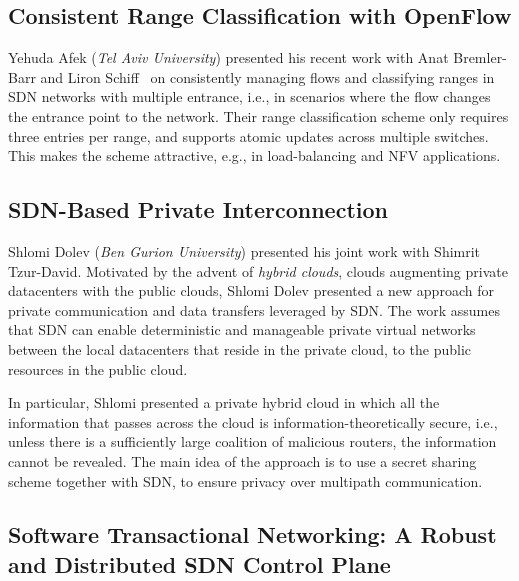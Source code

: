 \documentclass[11pt,pdftex,letter]{article}
\begin{document}
\subsection{Consistent Range Classification with OpenFlow}

Yehuda Afek ({\em Tel Aviv University}) presented his recent work with Anat Bremler-Barr and
Liron Schiff~\cite{AfekBS14} on consistently managing flows and classifying ranges
in SDN networks with multiple entrance, i.e., in scenarios where the flow changes the entrance point
to the network.
Their range classification scheme only requires three entries per range,
and supports atomic updates across multiple switches. This makes the scheme attractive,
e.g., in load-balancing and NFV applications.


\subsection{SDN-Based Private Interconnection}

Shlomi Dolev (\emph{Ben Gurion University}) presented his joint work with Shimrit Tzur-David.
Motivated by the advent of \emph{hybrid clouds}, clouds augmenting
private datacenters with the public clouds, Shlomi Dolev
presented a new approach for private communication and data transfers
leveraged by SDN. The work assumes that SDN can enable deterministic and manageable private virtual
networks between the local datacenters that reside in the private cloud, to the public resources in the public cloud.

In particular, Shlomi presented a private hybrid cloud in which all the information that passes across the cloud is information-theoretically
secure, i.e., unless there is a sufficiently large coalition of malicious routers, the information cannot be revealed.
The main idea of the approach is to use a
secret sharing scheme together with SDN, to ensure privacy over
multipath communication.


\subsection{Software Transactional Networking: A Robust and
  Distributed SDN Control Plane}
\end{document}
